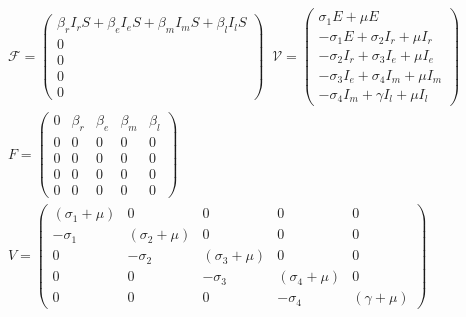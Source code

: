 \begin{gather*}
\mathcal{F} = \left(\begin{array}{c}
\beta_r I_r S+ \beta_e I_e S+ \beta_m I_m S+ \beta_l I_l S\\
0 \\
0 \\
0 \\
0
\end{array}\right) \;\;
\mathcal{V} = \left(\begin{array}{c}
\sigma_1 E + \mu E\\
-\sigma_1 E + \sigma_2 I_r + \mu I_r \\
-\sigma_2 I_r + \sigma_3 I_e + \mu I_e \\
-\sigma_3 I_e + \sigma_4 I_m + \mu I_m \\
-\sigma_4 I_m + \gamma I_l + \mu I_l
\end{array}\right)\\
F=\left(\begin{array}{rrrrr}
0 & \beta_r & \beta_e & \beta_m & \beta_l \\
0 & 0 & 0 & 0 & 0 \\
0 & 0 & 0 & 0 & 0 \\
0 & 0 & 0 & 0 & 0 \\
0 & 0 & 0 & 0 & 0
\end{array}\right)\\
V=\left(\begin{array}{rrrrr}
(\sigma_1 + \mu) & 0 & 0 & 0 & 0 \\
-\sigma_1 & (\sigma_2 + \mu) & 0 & 0 & 0 \\
0 & -\sigma_2 & (\sigma_3 + \mu) & 0 & 0 \\
0 & 0 & -\sigma_3 & (\sigma_4 + \mu) & 0 \\
0 & 0 & 0 & -\sigma_4 & (\gamma + \mu)
\end{array}\right)
\end{gather*}
